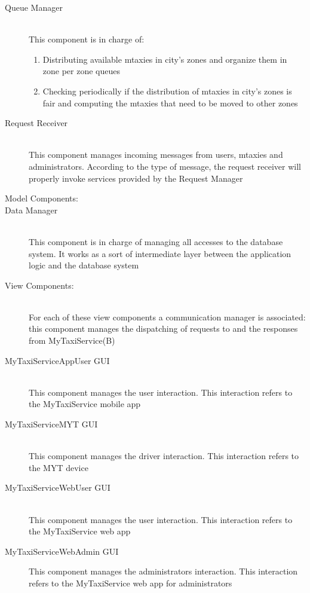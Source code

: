 \documentclass[11pt,titlepage]{article} %
\begin{document}
\begin{description}
		        \item [Queue Manager] \hfill \\
		            This component is in charge of:
			  \begin{enumerate}
			            \item Distributing available mtaxies in city's zones and organize them in zone per zone queues
			            \item Checking periodically if the distribution of mtaxies in city's zones is fair and computing the mtaxies
			            that need to be moved to other zones
			 \end{enumerate}
		        \item [Request Receiver] \hfill \\
		            This component manages incoming messages from users, mtaxies and administrators.
		            According to the type of message, the request receiver will properly invoke services provided by the Request Manager

	      \item [Model Components:] 
		        \item [Data Manager] \hfill \\
		            This component is in charge of managing all accesses to the database system. It works as a sort of
		            intermediate layer between the application logic and the database system
	
	      \item [View Components:] \hfill \\
		For each of these view components a communication manager is associated: this component manages the dispatching of requests to and the responses from MyTaxiService(B)
		        \item [MyTaxiServiceAppUser GUI]\hfill \\
		            This component manages the user interaction. This interaction refers to the
		            MyTaxiService mobile app
		        \item [MyTaxiServiceMYT GUI] \hfill \\
		            This component manages the driver interaction. This interaction refers to
		            the MYT device
		        \item [MyTaxiServiceWebUser GUI] \hfill \\
		          This component manages the user interaction. This interaction refers to
		          the MyTaxiService web app
		        \item [MyTaxiServiceWebAdmin GUI] \hfill
		          This component manages the administrators interaction. This interaction refers to
		          the MyTaxiService web app for administrators
	\end{description}
\end{document}
